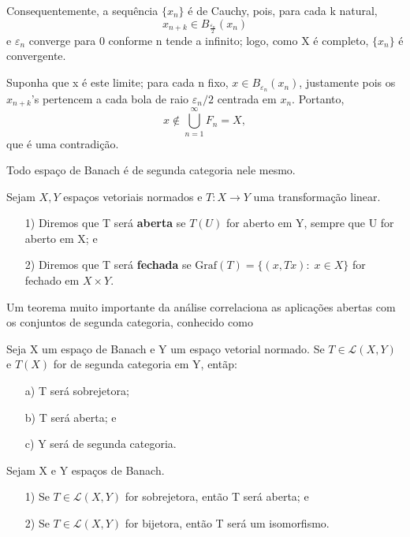 \documentclass[../functional_analysis.tex]{subfiles}
\begin{document}
\begin{proof*}
	Consequentemente, a sequência \(\{x_{n}\}\) é de Cauchy, pois, para cada k natural,
	\[
		x_{n+k}\in B_{\frac{\varepsilon_{n}}{2}}(x_{n})
	\]
	e \(\varepsilon_{n}\) converge para 0 conforme n tende a infinito; logo, como X é completo, \(\{x_{n}\}\) é convergente.

	Suponha que x é este limite; para cada n fixo, \(x\in B_{\varepsilon_n}(x_{n})\), justamente pois os \(x_{n+k}\)'s pertencem a cada bola de raio \(\varepsilon_{n}/2\) centrada em \(x_{n}\). Portanto,
	\[
		x\not\in \bigcup_{n=1}^{\infty}F_{n} = X,
	\]
	que é uma contradição. \qedsymbol

\end{proof*}
\begin{example}
	Todo espaço de Banach é de segunda categoria nele mesmo.
\end{example}
\begin{def*}
	Sejam \(X, Y\) espaços vetoriais normados e \(T:X\rightarrow Y\) uma transformação linear.
	\begin{itemize}
		\item[1)] Diremos que T será \textbf{aberta} se \(T(U)\) for aberto em Y, sempre que U for aberto em X; e
		\item[2)] Diremos que T será \textbf{fechada} se \(\mathrm{Graf}(T) = \{(x, Tx):\; x\in X\}\) for fechado em \(X\times Y\).
	\end{itemize}
\end{def*}
Um teorema muito importante da análise correlaciona as aplicações abertas com os conjuntos de segunda categoria, conhecido como
\hypertarget{open_application}{
	\begin{theorem*}
		Seja X um espaço de Banach e Y um espaço vetorial normado. Se \(T\in \mathcal{L}(X, Y)\) e \(T(X)\) for de segunda categoria em Y, entãp:
		\begin{itemize}
			\item[a)] T será sobrejetora;
			\item[b)] T será aberta; e
			\item[c)] Y será de segunda categoria.
		\end{itemize}
	\end{theorem*}
}
\begin{crl*}
	Sejam X e Y espaços de Banach.
	\begin{itemize}
		\item[1)] Se \(T\in \mathcal{L}(X, Y)\) for sobrejetora, então T será aberta; e
		\item[2)] Se \(T\in \mathcal{L}(X, Y)\) for bijetora, então T será um isomorfismo.
	\end{itemize}
\end{crl*}
\end{document}
